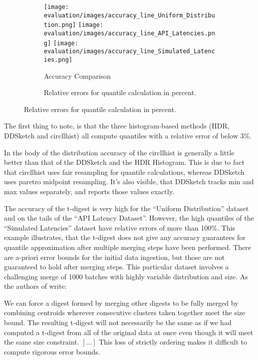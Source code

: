 \documentclass{article}
\theoremstyle{plain}
\theoremstyle{remark}
\begin{document}
\begin{figure}
  \begin{subfigure}{\textwidth}
    \texttt{[image: evaluation/images/accuracy\_line\_Uniform\_Distribution.png]}
    \texttt{[image: evaluation/images/accuracy\_line\_API\_Latencies.png]}
    \texttt{[image: evaluation/images/accuracy\_line\_Simulated\_Latencies.png]}
    \caption{Accuracy Comparison}
    \label{fig:acc}
  \end{subfigure}
  \begin{subfigure}{\textwidth}
    \begin{minipage}{\textwidth}
      \scriptsize
      
    \end{minipage}
    \caption{Relative errors for quantile calculation in percent.}
    \label{tab:acc}
  \end{subfigure}
\end{figure}

The first thing to note, is that the three histogram-based methods (HDR, DDSketch and circllhist)
all compute quantiles with a relative error of below 3\%.

In the body of the distribution accuracy of the circllhist is generally a little better than that of
the DDSketch and the HDR Histogram.  This is due to fact that circllhist uses fair resampling for
quantile calculations, whereas DDSketch uses paretro midpoint resampling.  It's also visible, that
DDSketch tracks min and max values separately, and reports those values exactly.

The accuracy of the t-digest is very high for the ``Uniform Distribution'' dataset and on the tails
of the ``API Latency Dataset''. However, the high quantiles of the ``Simulated Latencies'' dataset
have relative errors of more than 100\%. This example illustrates, that the t-digest does not give
any accuracy guarantees for quantile approximation after multiple merging steps have been performed.
There are a-priori error bounds for the initial data ingestion, but those are not guaranteed to hold
after merging steps. This particular dataset involves a challenging merge of 1000 batches with
highly variable distribution and size. As the authors of \cite{tdigest} write:

\begin{displayquote}
  We can force a digest formed by merging other digests to be fully merged by combining centroids
  wherever consecutive clusters taken together meet the size bound. The resulting t-digest will not
  necessarily be the same as if we had computed a t-digest from all of the original data at once
  even though it will meet the same size constraint. $[\dots]$ This loss of strictly ordering makes
  it difficult to compute rigorous error bounds.
\end{displayquote}
\end{document}
